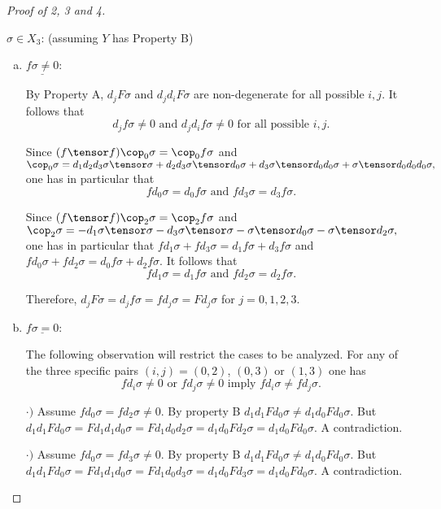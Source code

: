 \documentclass[thesis.tex]{subfiles}
\begin{document}
\begin{proof}[Proof of 2, 3 and 4]
\begin{enumerate}[a)]
\begin{enumerate}[i)]
        \end{enumerate}
    \end{enumerate}
$\sigma\in X_3$: (assuming $Y$ has Property B) \par
    \begin{enumerate}[a)]
    \item $\underline{f\sigma\neq0}$: \vspace*{5pt}\par

    By Property A, $d_jF\sigma$ and $d_jd_iF\sigma$ are non-degenerate for all possible $i,j$. It follows that $$d_jf\sigma\neq0 \text{ and } d_jd_if\sigma\neq 0 \text{ for all possible }i,j.$$ \par

    Since $(f\tensor f)\cop_0\sigma=\cop_0f\sigma$ and
    $\cop_0\sigma=d_1d_2d_3\sigma\tensor\sigma + d_2d_3\sigma\tensor d_0\sigma + d_3\sigma\tensor d_0d_0\sigma + \sigma\tensor d_0d_0d_0\sigma,$
    one has in particular that $$fd_0\sigma=d_0f\sigma\text{ and }fd_3\sigma=d_3f\sigma.$$

    Since $(f\tensor f)\cop_2\sigma=\cop_2f\sigma$ and
    $\cop_2\sigma=-d_1\sigma\tensor\sigma - d_3\sigma\tensor\sigma - \sigma\tensor d_0\sigma - \sigma\tensor d_2\sigma,$
    one has in particular that $fd_1\sigma+fd_3\sigma=d_1f\sigma+d_3f\sigma$ and $fd_0\sigma+fd_2\sigma=d_0f\sigma+d_2f\sigma$. It follows that $$fd_1\sigma=d_1f\sigma\text{ and }fd_2\sigma=d_2f\sigma.$$

    Therefore, $d_jF\sigma=d_jf\sigma=fd_j\sigma=Fd_j\sigma$ for $j=0,1,2,3$. \par

    \item $\underline{f\sigma=0}$: \vspace*{5pt}\par

    The following observation will restrict the cases to be analyzed. For any of the three specific pairs $(i,j)=(0,2)$, $(0,3)$ or $(1,3)$ one has $$fd_i\sigma\neq 0\text{ or } fd_j\sigma\neq 0 \text{ imply } fd_i\sigma\neq fd_j\sigma.$$

    $\cdot)$ Assume $fd_0\sigma=fd_2\sigma\neq0$. By property B $d_1d_1Fd_0\sigma\neq d_1d_0Fd_0\sigma$. But $d_1d_1Fd_0\sigma=Fd_1d_1d_0\sigma=Fd_1d_0d_2\sigma=d_1d_0Fd_2\sigma=d_1d_0Fd_0\sigma$. A contradiction. \par

    $\cdot)$ Assume $fd_0\sigma=fd_3\sigma\neq0$. By property B $d_1d_1Fd_0\sigma\neq d_1d_0Fd_0\sigma$. But $d_1d_1Fd_0\sigma=Fd_1d_1d_0\sigma=Fd_1d_0d_3\sigma=d_1d_0Fd_3\sigma=d_1d_0Fd_0\sigma$. A contradiction. \par


\end{enumerate}
\end{proof}
\end{document}
